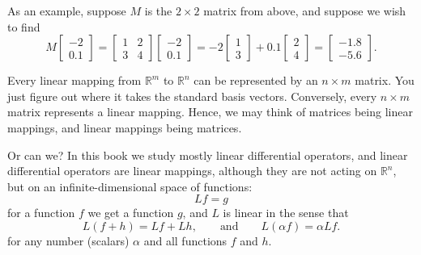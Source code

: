 \documentclass{ximera}
\begin{document}
As an example, suppose $M$ is the $2 \times 2$ matrix from above, and suppose we wish to find
\begin{equation*}
    M
    \begin{bmatrix}
        -2 \\ 0.1
    \end{bmatrix}
    =
    \begin{bmatrix}
        1 & 2 \\
        3 & 4
    \end{bmatrix}
    \begin{bmatrix}
        -2 \\ 0.1
    \end{bmatrix}
    = -2
    \begin{bmatrix}
        1 \\ 3
    \end{bmatrix}
    + 0.1 
    \begin{bmatrix}
        2 \\ 4
    \end{bmatrix}
    =
    \begin{bmatrix}
        -1.8 \\ -5.6
    \end{bmatrix} .
\end{equation*}

Every linear mapping from ${\mathbb R}^m$ to ${\mathbb R}^n$ can be represented by an $n \times m$ matrix.  You just figure out where it takes the standard basis vectors.  Conversely, every $n \times m$ matrix represents a linear mapping.  Hence, we may think of matrices being linear mappings, and linear mappings being matrices.

Or can we?  In this book we study mostly linear differential operators, and linear differential operators are linear mappings, although they are not acting on ${\mathbb R}^n$, but on  an infinite-dimensional space of functions:
\begin{equation*}
    L f = g
\end{equation*}
for a function $f$ we get a function $g$, and $L$ is linear in the sense that
\begin{equation*}
    L ( f + h) = Lf + Lh, \qquad \text{and} \qquad
    L (\alpha f) = \alpha Lf .
\end{equation*}
for any number (scalars) $\alpha$ and all functions $f$ and $h$.
\end{document}
